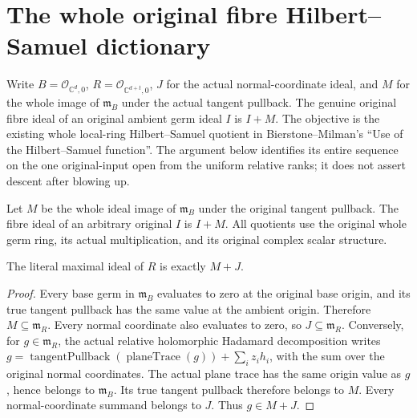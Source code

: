 \section{The whole original fibre Hilbert--Samuel dictionary}

Write $B=\mathcal O_{\mathbb C^d,0}$, $R=\mathcal O_{\mathbb C^{d+t},0}$,
$J$ for the actual normal-coordinate ideal, and $M$ for the whole image of
$\mathfrak m_B$ under the actual tangent pullback. The genuine original
fibre ideal of an original ambient germ ideal $I$ is $I+M$. The objective
is the existing whole local-ring Hilbert--Samuel quotient in
Bierstone--Milman's ``Use of the Hilbert--Samuel function''. The argument
below identifies its entire sequence on the one original-input open from
the uniform relative ranks; it does not assert descent after blowing up.

\begin{definition}
\label{hir:relative-normal-original-base-fibre-ideal}
\leanok
{}
Let $M$ be the whole ideal image of $\mathfrak m_B$ under the original
tangent pullback. The fibre ideal of an arbitrary original $I$ is $I+M$.
All quotients use the original whole germ ring, its actual multiplication,
and its original complex scalar structure.
\end{definition}

\begin{lemma}
\label{hir:relative-normal-original-fibre-maximal-ideal}
\leanok
{}
The literal maximal ideal of $R$ is exactly $M+J$.
\end{lemma}
\begin{proof}
Every base germ in $\mathfrak m_B$ evaluates to zero at the original base
origin, and its true tangent pullback has the same value at the ambient
origin. Therefore $M\subseteq\mathfrak m_R$. Every normal coordinate
also evaluates to zero, so $J\subseteq\mathfrak m_R$.
Conversely, for $g\in\mathfrak m_R$, the actual relative holomorphic
Hadamard decomposition writes
$g=\operatorname{tangentPullback}(\operatorname{planeTrace}(g))+
\sum_i z_i h_i$, with the sum over the original normal coordinates.
The actual plane trace has the same origin value as $g$, hence belongs
to $\mathfrak m_B$. Its true tangent pullback therefore belongs to $M$.
Every normal-coordinate summand belongs to $J$. Thus $g\in M+J$.
\end{proof}

